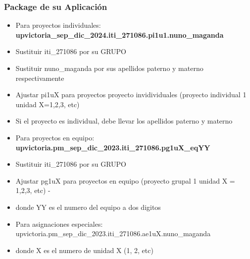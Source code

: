 \begin{frame}
\frametitle{Package de su Aplicaci\'on}
\begin{itemize}
\item Para proyectos individuales: \textbf{upvictoria\_sep\_dic\_2024.iti\_271086.pi1u1.nuno\_maganda}
\item Sustituir iti\_271086 por su GRUPO
\item Sustituir nuno\_maganda por sus apellidos paterno y materno respectivamente
\item Ajustar pi1uX para proyectos proyecto invidividuales (proyecto individual 1 unidad X=1,2,3, etc)
\item Si el proyecto es individual, debe llevar los apellidos paterno y materno
\item Para proyectos en equipo: \textbf{upvictoria.pm\_sep\_dic\_2023.iti\_271086.pg1uX\_eqYY}
\item Sustituir iti\_271086 por su GRUPO
\item Ajustar pg1uX para proyectos en equipo (proyecto grupal 1 unidad X = 1,2,3, etc) -
\item donde YY es el numero del equipo a dos digitos
\item Para asignaciones especiales: upvictoria.pm\_sep\_dic\_2023.iti\_271086.ae1uX.nuno\_maganda
\item  donde X es el numero de unidad X (1, 2, etc) 
\end{itemize}

\end{frame}
